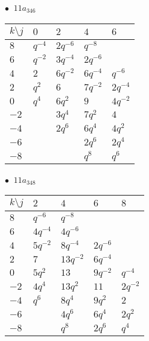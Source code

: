 \begin{minipage}{\linewidth}
$\bullet\ $ $11a_{346}$ \vspace{0.5em} \\
\begin{tabular}{l|llll}
$k \setminus j$ & $0$ & $2$ & $4$ & $6$ \\
\hline
$8$ & $q^{-4}$ & $2q^{-6}$ & $q^{-8}$ &  \\
$6$ & $q^{-2}$ & $3q^{-4}$ & $2q^{-6}$ &  \\
$4$ & $2$ & $6q^{-2}$ & $6q^{-4}$ & $q^{-6}$ \\
$2$ & $q^{2}$ & $6$ & $7q^{-2}$ & $2q^{-4}$ \\
$0$ & $q^{4}$ & $6q^{2}$ & $9$ & $4q^{-2}$ \\
$-2$ &  & $3q^{4}$ & $7q^{2}$ & $4$ \\
$-4$ &  & $2q^{6}$ & $6q^{4}$ & $4q^{2}$ \\
$-6$ &  &  & $2q^{6}$ & $2q^{4}$ \\
$-8$ &  &  & $q^{8}$ & $q^{6}$ \\
\end{tabular}
\vspace{2em}
\end{minipage}
%
\begin{minipage}{\linewidth}
$\bullet\ $ $11a_{348}$ \vspace{0.5em} \\
\begin{tabular}{l|llll}
$k \setminus j$ & $2$ & $4$ & $6$ & $8$ \\
\hline
$8$ & $q^{-6}$ & $q^{-8}$ &  &  \\
$6$ & $4q^{-4}$ & $4q^{-6}$ &  &  \\
$4$ & $5q^{-2}$ & $8q^{-4}$ & $2q^{-6}$ &  \\
$2$ & $7$ & $13q^{-2}$ & $6q^{-4}$ &  \\
$0$ & $5q^{2}$ & $13$ & $9q^{-2}$ & $q^{-4}$ \\
$-2$ & $4q^{4}$ & $13q^{2}$ & $11$ & $2q^{-2}$ \\
$-4$ & $q^{6}$ & $8q^{4}$ & $9q^{2}$ & $2$ \\
$-6$ &  & $4q^{6}$ & $6q^{4}$ & $2q^{2}$ \\
$-8$ &  & $q^{8}$ & $2q^{6}$ & $q^{4}$ \\
\end{tabular}
\vspace{2em}
\end{minipage}
%
